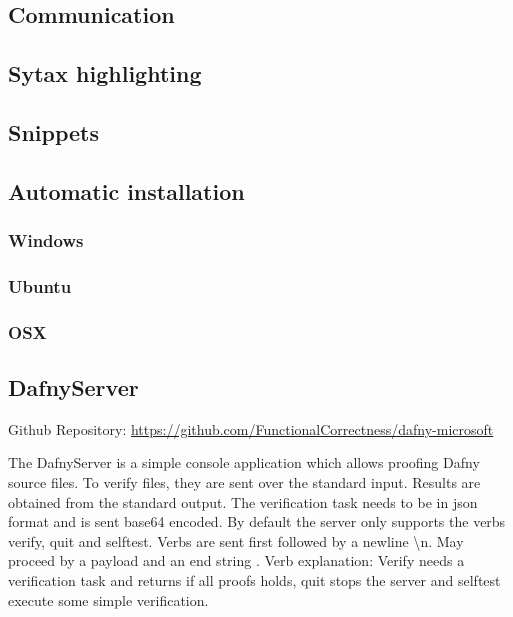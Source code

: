 \subsection{Communication}

\subsection{Sytax highlighting}

\subsection{Snippets}

\subsection{Automatic installation}
\subsubsection{Windows}

\subsubsection{Ubuntu}

\subsubsection{OSX}


\subsection{DafnyServer}
Github Repository: \href{https://github.com/FunctionalCorrectness/dafny-microsoft}{https://github.com/FunctionalCorrectness/dafny-microsoft}

The DafnyServer is a simple console application which allows proofing Dafny source files. To verify files, they are sent over the standard input. Results are obtained from the standard output. The verification task needs to be in json format  and is sent base64 encoded. By default the server only supports the verbs verify, quit and selftest. Verbs are sent first followed by a newline \textbackslash{n}. May proceed by a payload and an end string . 
Verb explanation: Verify needs a verification task and returns if all proofs holds, quit stops the server and selftest execute some simple verification. 

